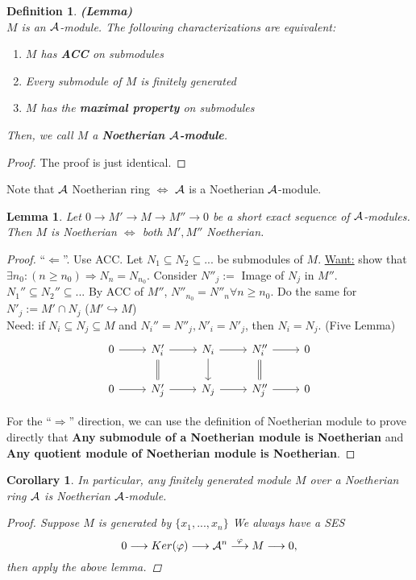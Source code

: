 \documentclass[11pt]{article}
\newtheorem{lemma}[thm]{Lemma}
\newtheorem{cor}[thm]{Corollary}
\newtheorem{dfn}[thm]{Definition}
\newcommand{\cala}{{\cal A}}
\newcommand{\Lrta}{\Longrightarrow}
\newcommand{\lrta}{\longrightarrow}
\newcommand{\Llta}{\Longleftarrow}
\newcommand{\Llrta}{\Longleftrightarrow}
\newcommand{\inj}{\hookrightarrow}
\begin{document}
\begin{dfn}\textbf{(Lemma)}\\
$M$ is an $\cala$-module. The following characterizations are equivalent:
\begin{enumerate}[label=(\alph*)]
\item $M$ has \textbf{ACC} on submodules
\item Every submodule of $M$ is finitely generated
\item $M$ has the \textbf{maximal property} on submodules
\end{enumerate}
Then, we call $M$ a \textbf{Noetherian $\cala$-module}.
\end{dfn}
\begin{proof}
The proof is just identical.
\end{proof}

Note that $\cala$ Noetherian ring $\Llrta $ $\cala$ is a Noetherian $\cala$-module.

\begin{lemma}\label{lem:SES_Noetherian}
Let $0\lrta M'\lrta M\lrta M''\lrta 0$ be a short exact sequence of $\cala$-modules. Then $M$ is Noetherian $\Llrta $ both $M', M''$ Noetherian.
\end{lemma}
\begin{proof}
``$\Llta$''. Use ACC. Let $N_1\subseteq N_2\subseteq ...$ be submodules of $M$. \underline{Want:}  show that $\exists n_0 :(n\geq n_0)\Lrta N_n=N_{n_0}$.
Consider $N''_j:=$ Image of $N_j$ in $M''$. $ N_1''\subseteq N_2''\subseteq ...$ By ACC of $M''$, $N''_{n_0}=N''_{n}\forall n\geq n_0$. Do the same for $N'_j:=M'\cap N_j$ ($M'\inj M$)\\
Need: if $N_i\subseteq N_j\subseteq M$ and $N_i''=N''_j, N'_i=N'_j$, then $N_i=N_j$. (Five Lemma)
\[
\begin{tikzcd}
0\ar[r] & N_i'\ar[r]\ar[d,equal] & N_i\ar[r]\ar[d] & N_i''\ar[r]\ar[d,equal] & 0\\
0\ar[r] & N_j'\ar[r] & N_j\ar[r] & N_j''\ar[r] & 0
\end{tikzcd}
\]

For the ``$\Lrta$'' direction, we can use the definition of Noetherian module to prove directly that \textbf{Any submodule of a Noetherian module is Noetherian} and \textbf{Any quotient module of Noetherian module is Noetherian}.
\end{proof}

\begin{cor}\label{cor:finitely_generated_module_over_Noetherian_ring}
In particular, any finitely generated module $M$ over a Noetherian ring $\cala$ is Noetherian $\cala$-module.
\begin{proof}Suppose $M$ is generated by $\{x_1,...,x_n\}$
We always have a SES
$$
0\lrta Ker(\varphi)\lrta \cala^n\overset{\varphi}{\lrta} M\lrta 0,
$$
then apply the above lemma.
\end{proof}
\end{cor}
\end{document}
